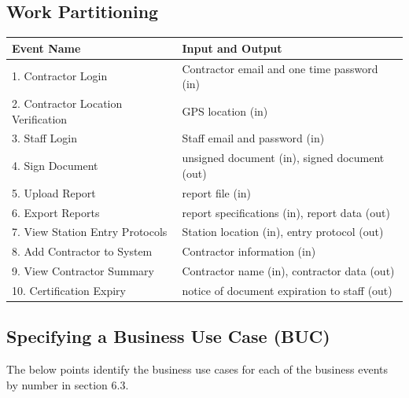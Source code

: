 \documentclass[12pt]{article}
\begin{document}
\subsection{Work Partitioning}
\begin{tabular}{|l|l|}
  \hline
  \textbf{Event Name} & \textbf{Input and Output} \\
  \hline
  1. Contractor Login & Contractor email and one time password (in) \\
  \hline
  2. Contractor Location Verification & GPS location (in) \\
  \hline
  3. Staff Login & Staff email and password (in) \\
  \hline
  4. Sign Document & unsigned document (in), signed document (out) \\
  \hline
  5. Upload Report & report file (in) \\
  \hline
  6. Export Reports & report specifications (in), report data (out)\\
  \hline
  7. View Station Entry Protocols & Station location (in), entry
  protocol (out)\\
  \hline
  8. Add Contractor to System & Contractor information (in) \\
  \hline
  9. View Contractor Summary & Contractor name (in), contractor data (out) \\
  \hline
  10. Certification Expiry & notice of document expiration to staff (out) \\
  \hline
\end{tabular}

\subsection{Specifying a Business Use Case (BUC)}
The below points identify the business use cases for each of the
business events by number in section 6.3.\\
\end{document}
